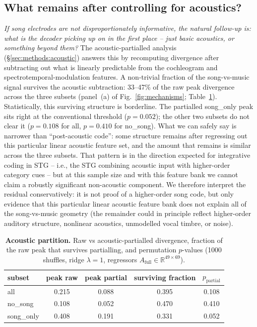 \documentclass[11pt]{article}
\begin{document}
\subsection{What remains after controlling for acoustics?}\label{sec:acoustic}

\emph{If song electrodes are not disproportionately informative, the natural follow-up is: what is the decoder picking up on in the first place -- just basic acoustics, or something beyond them?} The acoustic-partialled analysis (\S\ref{sec:methods:acoustic}) answers this by recomputing divergence after subtracting out what is linearly predictable from the cochleogram and spectrotemporal-modulation features. A non-trivial fraction of the song-vs-music signal survives the acoustic subtraction: 33--47\% of the raw peak divergence across the three subsets (panel~(a) of Fig.~\ref{fig:mechanisms}; Table~\ref{tab:acoustic}). Statistically, this surviving structure is borderline. The partialled \textsf{song\_only} peak sits right at the conventional threshold ($p = 0.052$); the other two subsets do not clear it ($p = 0.108$ for \textsf{all}, $p = 0.410$ for \textsf{no\_song}). What we can safely say is narrower than ``post-acoustic code'': some structure remains after regressing out this particular linear acoustic feature set, and the amount that remains is similar across the three subsets. That pattern is in the direction expected for integrative coding in STG \citep{Yi2019,Leonard2024,Sankaran2024} -- i.e., the STG combining acoustic input with higher-order category cues -- but at this sample size and with this feature bank we cannot claim a robustly significant non-acoustic component.
We therefore interpret the residual conservatively: it is not proof of a higher-order song code, but only evidence that this particular linear acoustic feature bank does not explain all of the song-vs-music geometry (the remainder could in principle reflect higher-order auditory structure, nonlinear acoustics, unmodelled vocal timbre, or noise).

\begin{table}[t]
\centering\small
\caption{\textbf{Acoustic partition.} Raw vs acoustic-partialled divergence, fraction of the raw peak that survives partialling, and permutation $p$-values (1000 shuffles, ridge $\lambda=1$, regressors $A_\text{full} \in \mathbb{R}^{49\times 69}$).}
\label{tab:acoustic}
\begin{tabular}{lcccc}
\toprule
subset & peak raw & peak partial & surviving fraction & $p_\text{partial}$ \\
\midrule
all        & 0.215 & 0.088 & 0.395 & 0.108 \\
no\_song   & 0.108 & 0.052 & 0.470 & 0.410 \\
song\_only & 0.408 & 0.191 & 0.331 & 0.052 \\
\bottomrule
\end{tabular}
\end{table}
\end{document}
